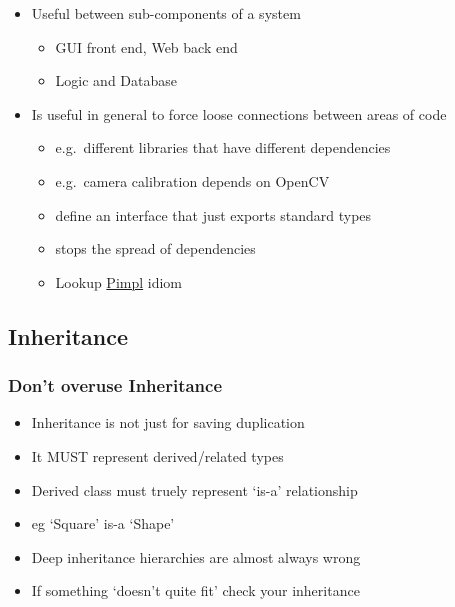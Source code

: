 \begin{itemize}
\itemsep1pt\parskip0pt
\item
  Useful between sub-components of a system

  \begin{itemize}
  \itemsep1pt\parskip0pt
  \item
    GUI front end, Web back end
  \item
    Logic and Database
  \end{itemize}
\item
  Is useful in general to force loose connections between areas of code

  \begin{itemize}
  \itemsep1pt\parskip0pt
  \item
    e.g.~different libraries that have different dependencies
  \item
    e.g.~camera calibration depends on OpenCV
  \item
    define an interface that just exports standard types
  \item
    stops the spread of dependencies
  \item
    Lookup \href{http://en.cppreference.com/w/cpp/language/pimpl}{Pimpl}
    idiom
  \end{itemize}
\end{itemize}

\subsection{Inheritance}\label{inheritance}

\subsubsection{Don't overuse
Inheritance}\label{dont-overuse-inheritance}

\begin{itemize}
\itemsep1pt\parskip0pt
\item
  Inheritance is not just for saving duplication
\item
  It MUST represent derived/related types
\item
  Derived class must truely represent `is-a' relationship
\item
  eg `Square' is-a `Shape'
\item
  Deep inheritance hierarchies are almost always wrong
\item
  If something `doesn't quite fit' check your inheritance
\end{itemize}

